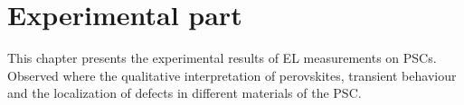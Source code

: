 
\chapter{Experimental part}
This chapter presents the experimental results of EL measurements on PSCs. Observed where the qualitative interpretation of perovskites, transient behaviour and the localization of defects in different materials of the PSC.